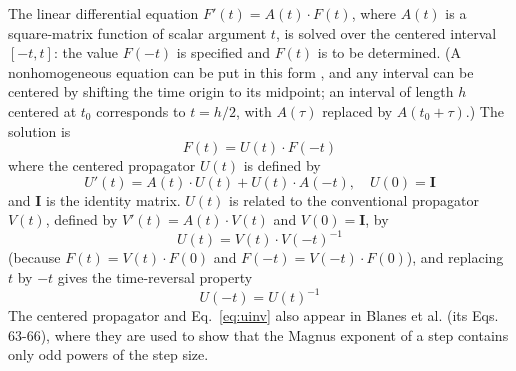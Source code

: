 \documentclass[12pt]{article}
\begin{document}
The linear differential equation $F'(t)=A(t)\cdot F(t)$, where $A(t)$ is a square-matrix function of scalar argument $t$, is solved over the centered interval $[-t,t]$: the value $F(-t)$ is specified and $F(t)$ is to be determined. (A nonhomogeneous equation can be put in this form \cite{jtut}, and any interval can be centered by shifting the time origin to its midpoint; an interval of length $h$ centered at $t_0$ corresponds to $t=h/2$, with $A(\tau)$ replaced by $A(t_0+\tau)$.) The solution is
\begin{equation}
F(t)=U(t)\cdot F(-t)\label{eq:centered}
\end{equation}
where the centered propagator $U(t)$ is defined by
\begin{equation}
U'(t)=A(t)\cdot U(t)+U(t)\cdot A(-t),\quad U(0)=\mathbf{I}\label{eq:uode}
\end{equation}
and $\mathbf{I}$ is the identity matrix. $U(t)$ is related to the conventional propagator $V(t)$, defined by $V'(t)=A(t)\cdot V(t)$ and $V(0)=\mathbf{I}$, by
\begin{equation}
U(t)=V(t)\cdot V(-t)^{-1}\label{eq:uv}
\end{equation}
(because $F(t)=V(t)\cdot F(0)$ and $F(-t)=V(-t)\cdot F(0)$), and replacing $t$ by $-t$ gives the time-reversal property
\begin{equation}
U(-t)=U(t)^{-1}\label{eq:uinv}
\end{equation}
The centered propagator and Eq.~\ref{eq:uinv} also appear in Blanes et al. \cite{bcor2009} (its Eqs. 63-66), where they are used to show that the Magnus exponent of a step contains only odd powers of the step size.
\end{document}
